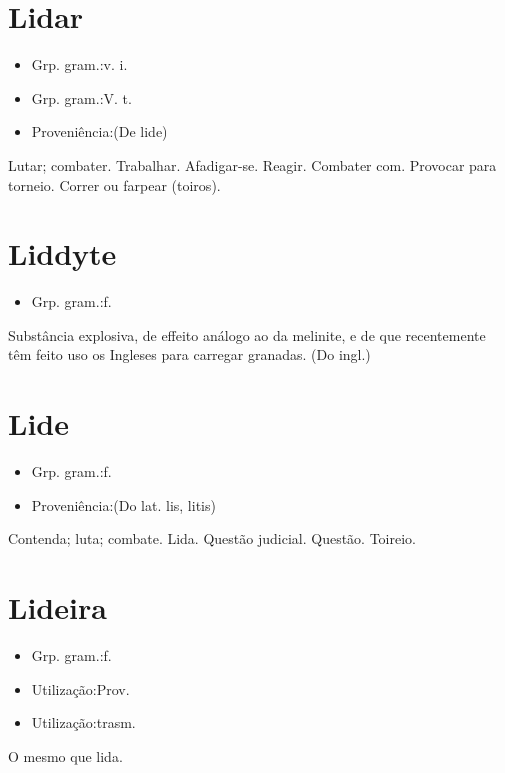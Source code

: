 \section{Lidar}
\begin{itemize}
\item {Grp. gram.:v. i.}
\end{itemize}
\begin{itemize}
\item {Grp. gram.:V. t.}
\end{itemize}
\begin{itemize}
\item {Proveniência:(De \textunderscore lide\textunderscore )}
\end{itemize}
Lutar; combater.
Trabalhar.
Afadigar-se.
Reagir.
Combater com.
Provocar para torneio.
Correr ou farpear (toiros).
\section{Liddyte}
\begin{itemize}
\item {Grp. gram.:f.}
\end{itemize}
Substância explosiva, de effeito análogo ao da melinite, e de que recentemente têm feito uso os Ingleses para carregar granadas.
(Do ingl.)
\section{Lide}
\begin{itemize}
\item {Grp. gram.:f.}
\end{itemize}
\begin{itemize}
\item {Proveniência:(Do lat. \textunderscore lis\textunderscore , \textunderscore litis\textunderscore )}
\end{itemize}
Contenda; luta; combate.
Lida.
Questão judicial.
Questão.
Toireio.
\section{Lideira}
\begin{itemize}
\item {Grp. gram.:f.}
\end{itemize}
\begin{itemize}
\item {Utilização:Prov.}
\end{itemize}
\begin{itemize}
\item {Utilização:trasm.}
\end{itemize}
O mesmo que \textunderscore lida\textunderscore .
